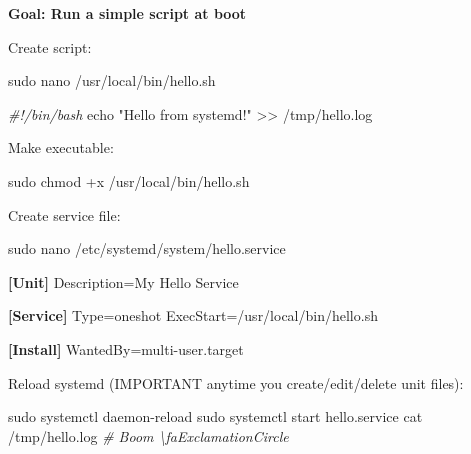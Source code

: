 \documentclass[
  english,
  paper=a4,
  oneside  ,captions=tableheading
]{scrartcl}
\newenvironment{Shaded}{}{}
\newcommand{\BuiltInTok}[1]{\textcolor[rgb]{0.00,0.50,0.00}{#1}}
\newcommand{\CommentTok}[1]{\textcolor[rgb]{0.38,0.63,0.69}{\textit{#1}}}
\newcommand{\DataTypeTok}[1]{\textcolor[rgb]{0.56,0.13,0.00}{#1}}
\newcommand{\FunctionTok}[1]{\textcolor[rgb]{0.02,0.16,0.49}{#1}}
\newcommand{\KeywordTok}[1]{\textcolor[rgb]{0.00,0.44,0.13}{\textbf{#1}}}
\newcommand{\NormalTok}[1]{#1}
\newcommand{\OperatorTok}[1]{\textcolor[rgb]{0.40,0.40,0.40}{#1}}
\newcommand{\OtherTok}[1]{\textcolor[rgb]{0.00,0.44,0.13}{#1}}
\newcommand{\StringTok}[1]{\textcolor[rgb]{0.25,0.44,0.63}{#1}}
\begin{document}
\textbf{Goal: Run a simple script at boot}

Create script:

\begin{Shaded}
\begin{Highlighting}[]
\FunctionTok{sudo}\NormalTok{ nano /usr/local/bin/hello.sh}
\end{Highlighting}
\end{Shaded}

\begin{Shaded}
\begin{Highlighting}[]
\CommentTok{\#!/bin/bash}
\BuiltInTok{echo} \StringTok{"Hello from systemd!"} \OperatorTok{\textgreater{}\textgreater{}}\NormalTok{ /tmp/hello.log}
\end{Highlighting}
\end{Shaded}

Make executable:

\begin{Shaded}
\begin{Highlighting}[]
\FunctionTok{sudo}\NormalTok{ chmod +x /usr/local/bin/hello.sh}
\end{Highlighting}
\end{Shaded}

Create service file:

\begin{Shaded}
\begin{Highlighting}[]
\FunctionTok{sudo}\NormalTok{ nano /etc/systemd/system/hello.service}
\end{Highlighting}
\end{Shaded}

\begin{Shaded}
\begin{Highlighting}[]
\KeywordTok{[Unit]}
\DataTypeTok{Description}\OtherTok{=}\StringTok{My Hello Service}

\KeywordTok{[Service]}
\DataTypeTok{Type}\OtherTok{=}\StringTok{oneshot}
\DataTypeTok{ExecStart}\OtherTok{=}\StringTok{/usr/local/bin/hello.sh}

\KeywordTok{[Install]}
\DataTypeTok{WantedBy}\OtherTok{=}\StringTok{multi{-}user.target}
\end{Highlighting}
\end{Shaded}

Reload systemd (IMPORTANT anytime you create/edit/delete unit files):

\begin{Shaded}
\begin{Highlighting}[]
\FunctionTok{sudo}\NormalTok{ systemctl daemon{-}reload}
\FunctionTok{sudo}\NormalTok{ systemctl start hello.service}
\FunctionTok{cat}\NormalTok{ /tmp/hello.log    }\CommentTok{\# Boom \textbackslash{}faExclamationCircle}
\end{Highlighting}
\end{Shaded}
\end{document}
